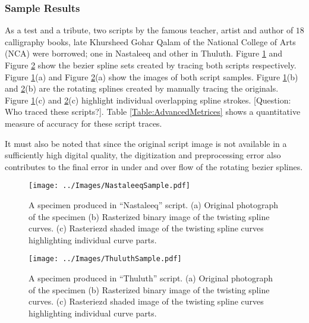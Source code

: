 \subsubsection{Sample Results}
As a test and a tribute, two scripts by the famous teacher, artist and author of $18$ calligraphy books, late Khursheed Gohar Qalam \cite{bib23} of the National College of Arts (NCA) were borrowed; one in Nastaleeq and other in Thuluth. Figure \ref{Fig:Nastaleeq} and Figure \ref{Fig:Thuluth} show the bezier spline sets created by tracing both scripts respectively. Figure \ref{Fig:Nastaleeq}(a) and Figure \ref{Fig:Thuluth}(a) show the images of both script samples. Figure \ref{Fig:Nastaleeq}(b) and \ref{Fig:Thuluth}(b) are the rotating splines created by manually tracing the originals. Figure \ref{Fig:Nastaleeq}(c) and \ref{Fig:Thuluth}(c) highlight individual overlapping spline strokes. [Question: Who traced these scripts?]. Table \ref{Table:AdvancedMetrices} shows a quantitative measure of accuracy for these script traces. 

It must also be noted that since the original script image is not available in a sufficiently high digital quality, the digitization and preprocessing error also contributes to the final error in under and over flow of the rotating bezier splines.

    \begin{figure}[!t]
    \centering
    \texttt{[image: ../Images/NastaleeqSample.pdf]}
      \caption{
        A specimen produced in ``Nastaleeq'' script. (a) Original photograph of the specimen (b) Rasterized binary image of the twisting spline curves. (c) Rasteriezd shaded image of the twisting spline curves highlighting individual curve parts.}
      \label{Fig:Nastaleeq}
    \end{figure}


    \begin{figure}[!t]
    \centering
    \texttt{[image: ../Images/ThuluthSample.pdf]}
    \caption{
        A specimen produced in ``Thuluth'' script. (a) Original photograph of the specimen (b) Rasterized binary image of the twisting spline curves. (c) Rasteriezd shaded image of the twisting spline curves highlighting individual curve parts.
    }
  \label{Fig:Thuluth}
\end{figure}

